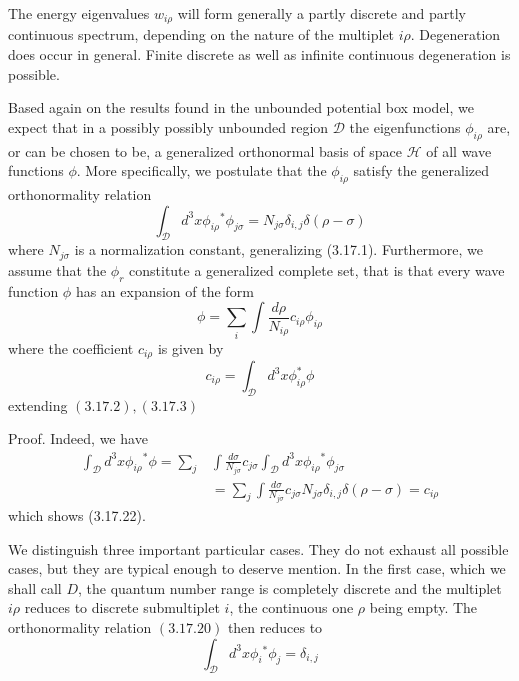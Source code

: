 \documentclass{article}
\begin{document}
The energy eigenvalues $w_{i \rho}$ will form generally a partly discrete and partly continuous spectrum, depending on the nature of the multiplet $i \rho$. Degeneration does occur in general. Finite discrete as well as infinite continuous degeneration is possible.

Based again on the results found in the unbounded potential box model, we expect that in a possibly possibly unbounded region $\mathcal{D}$ the eigenfunctions $\phi_{i \rho}$ are, or can be chosen to be, a generalized orthonormal basis of space $\mathcal{H}$ of all wave functions $\phi$. More specifically, we postulate that the $\phi_{i \rho}$ satisfy the generalized orthonormality relation
$$
\begin{equation*}
\int_{\mathcal{D}} d^{3} x \phi_{i \rho}{ }^{*} \phi_{j \sigma}=N_{j \sigma} \delta_{i, j} \delta(\rho-\sigma) \tag{3.17.20}
\end{equation*}
$$
where $N_{j \sigma}$ is a normalization constant, generalizing (3.17.1). Furthermore, we assume that the $\phi_{r}$ constitute a generalized complete set, that is that every wave function $\phi$ has an expansion of the form
$$
\begin{equation*}
\phi=\sum_{i} \int \frac{d \rho}{N_{i \rho}} c_{i \rho} \phi_{i \rho} \tag{3.17.21}
\end{equation*}
$$
where the coefficient $c_{i \rho}$ is given by
$$
\begin{equation*}
c_{i \rho}=\int_{\mathcal{D}} d^{3} x \phi_{i \rho}^{*} \phi \tag{3.17.22}
\end{equation*}
$$
extending $(3.17 .2),(3.17 .3)$

Proof. Indeed, we have
$$
\begin{align*}
\int_{\mathcal{D}} d^{3} x \phi_{i \rho}{ }^{*} \phi=\sum_{j} & \int \frac{d \sigma}{N_{j \sigma}} c_{j \sigma} \int_{\mathcal{D}} d^{3} x \phi_{i \rho}{ }^{*} \phi_{j \sigma}  \tag{3.17.23}\\
& =\sum_{j} \int \frac{d \sigma}{N_{j \sigma}} c_{j \sigma} N_{j \sigma} \delta_{i, j} \delta(\rho-\sigma)=c_{i \rho}
\end{align*}
$$
which shows (3.17.22).

We distinguish three important particular cases. They do not exhaust all possible cases, but they are typical enough to deserve mention. In the first case, which we shall call $D$, the quantum number range is completely discrete and the multiplet $i \rho$ reduces to discrete submultiplet $i$, the continuous one $\rho$ being empty. The orthonormality relation $(3.17 .20)$ then reduces to
$$
\begin{equation*}
\int_{\mathcal{D}} d^{3} x \phi_{i}{ }^{*} \phi_{j}=\delta_{i, j} \tag{3.17.24}
\end{equation*}
$$
\end{document}
